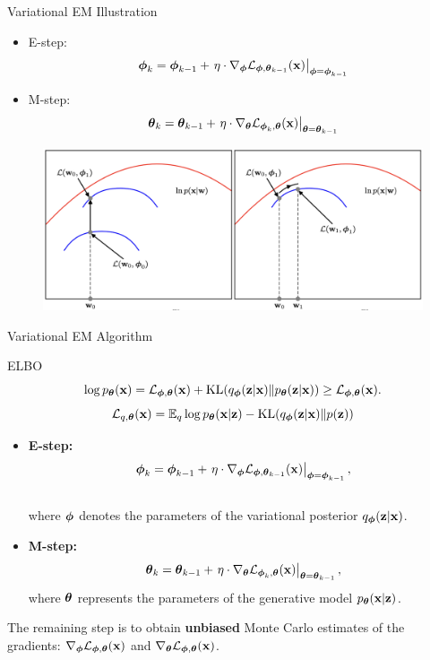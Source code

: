 \documentclass{beamer}
\begin{document}
\begin{frame}{Variational EM Illustration}
	\begin{itemize}
		\item E-step:
		\[
			\bphi_k = \bphi_{k-1} + \left.\eta \cdot \nabla_{\bphi} \cL_{\bphi, \btheta_{k-1}}(\bx)\right|_{\bphi=\bphi_{k-1}}
		\]
		\item M-step:
		\[
			\btheta_k = \btheta_{k-1} + \left.\eta \cdot \nabla_{\btheta} \cL_{\bphi_k, \btheta}(\bx)\right|_{\btheta=\btheta_{k-1}}
		\]
	\end{itemize}
	\begin{figure}
		\includegraphics[width=\linewidth]{figs/em_bishop4}
	\end{figure}
		
\end{frame}
\begin{frame}{Variational EM Algorithm}
	\begin{block}{ELBO}
		\vspace{-0.5cm}
		\[
			\log \pt(\bx) = \cL_{\bphi, \btheta}(\bx) + \KL(q_{\bphi}(\bz| \bx) \| \pt(\bz|\bx)) \geq \cL_{\bphi, \btheta}(\bx).
		\]
		\[
		 	\cL_{q, \btheta}(\bx) = \bbE_{q} \log \pt(\bx | \bz) - \KL(q_{\bphi}(\bz| \bx) \| p(\bz))
		\]
		\vspace{-0.5cm}
	\end{block}
	\eqpause
	\begin{itemize}
		\item \textbf{E-step:}
		\vspace{-0.3cm}
		\[
			\bphi_k = \bphi_{k-1} + \left.\eta \cdot \nabla_{\bphi} \cL_{\bphi, \btheta_{k-1}}(\bx)\right|_{\bphi=\bphi_{k-1}},
		\]
		\vspace{-0.3cm} \\
		where $\bphi$ denotes the parameters of the variational posterior $q_{\bphi}(\bz| \bx)$.
		\item \textbf{M-step:}
		\[
			\btheta_k = \btheta_{k-1} + \left.\eta \cdot \nabla_{\btheta} \cL_{\bphi_k, \btheta}(\bx)\right|_{\btheta=\btheta_{k-1}},
		\]
		where $\btheta$ represents the parameters of the generative model $\pt(\bx | \bz)$.
	\end{itemize}
	\eqpause
	The remaining step is to obtain \textbf{unbiased} Monte Carlo estimates of the gradients: $\nabla_{\bphi} \cL_{\bphi, \btheta}(\bx)$ and $\nabla_{\btheta} \cL_{\bphi, \btheta}(\bx)$. 
\end{frame}
\end{document}

